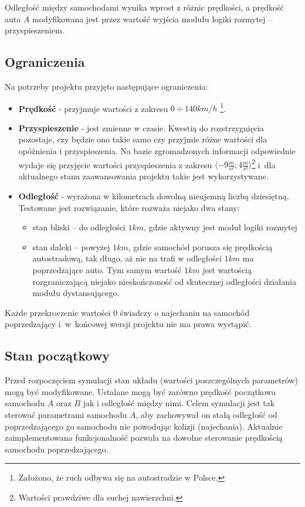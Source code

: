 \documentclass[11pt,a4paper]{article}
\begin{document}
Odległość między samochodami wynika wprost z różnic prędkości, a prędkość auta $A$ modyfikowana jest przez wartość wyjścia modułu logiki rozmytej -- przyspieszeniem.

\subsection{Ograniczenia}
Na potrzeby projektu przyjęto następujące ograniczenia:
\begin{itemize}
\item \textbf{Prędkość} - przyjmuje wartości z zakresu $0\div140km/h$ \footnote{Założono, że ruch odbywa się na autostradzie w Polsce.}.
\item \textbf{Przyspieszenie} - jest zmienne w czasie. Kwestią do rozstrzygnięcia pozostaje, czy będzie ono takie samo czy przyjmie różne wartości dla opóźnienia i przyspieszenia. Na bazie zgromadzonych informacji odpowiednie wydaje się przyjęcie wartości przyspieszenia z zakresu $\langle-9\frac{m}{s^2};4\frac{m}{s^2}\rangle$\footnote{Wartości prawdziwe dla suchej nawierzchni.} i~dla aktualnego stanu zaawansowania projektu takie jest wykorzystywane.
\item \textbf{Odległość} - wyrażona w kilometrach dowolną nieujemną liczbą dziesiętną. Testowane jest rozwiązanie, które rozważa niejako dwa stany:
	\begin{itemize}
		\item stan bliski -- do odległości $1 km$, gdzie aktywny jest moduł logiki rozmytej
		\item stan daleki -- powyżej $1km$, gdzie samochód porusza się prędkością autostradową, tak długo, aż nie na trafi w odległości $1 km$ ma poprzedzające auto. Tym samym wartość $1 km$ jest wartością rozgraniczającą niejako nieskończoność od skutecznej odległości działania modułu dystansującego.
	\end{itemize}
\end{itemize}
Każde przekroczenie wartości $0$ świadczy o najechaniu na samochód poprzedzający i~w~końcowej wersji projektu nie ma prawa wystąpić.

\subsection{Stan początkowy}
Przed rozpoczęciem symulacji stan układu (wartości poszczególnych parametrów) mogą być modyfikowane. Ustalane mogą być zarówno prędkość początkowa samochodu $A$ oraz $B$ jak i odległość między nimi. Celem symulacji jest tak sterować parametrami samochodu $A$, aby zachowywał on stałą odległość od poprzedzającego go samochodu nie powodując kolizji (najechania). Aktualnie zaimplementowana funkcjonalność pozwala na dowolne sterowanie prędkością samochodu poprzedzającego.
\end{document}
